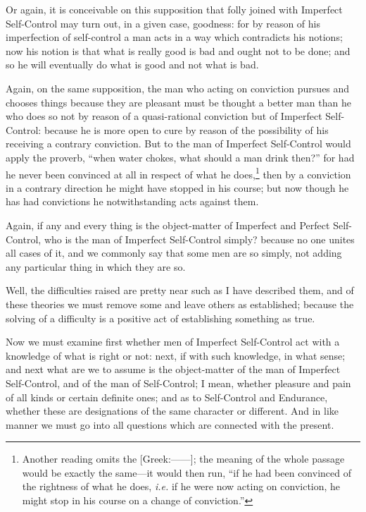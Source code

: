 Or again, it is conceivable on this supposition that folly joined with
Imperfect Self-Control may turn out, in a given case, goodness: for by reason
of his imperfection of self-control a man acts in a way which contradicts his
notions; now his notion is that what is really good is bad and ought not to be
done; and so he will eventually do what is good and not what is bad.

Again, on the same supposition, the man who acting on conviction pursues and
chooses things because they are pleasant must be thought a better man than he
who does so not by reason of a quasi-rational conviction but of Imperfect
Self-Control: because he is more open to cure by reason of the possibility of
his receiving a contrary conviction. But to the man of Imperfect Self-Control
would apply the proverb, “when water chokes, what should a man drink
then?” for had he never been convinced at all in respect of what he
does,\footnote{Another reading omits the [Greek:——]; the meaning of the whole
passage would be exactly the same—it would then run, “if he had
been convinced of the rightness of what he does, \emph{i.e.} if he were now
acting on conviction, he might stop in his course on a change of
conviction.”}
then by a conviction in a contrary direction he might have stopped in his
course; but now though he has had convictions he notwithstanding acts against
them.

Again, if any and every thing is the object-matter of Imperfect and Perfect
Self-Control, who is the man of Imperfect Self-Control simply? because no one
unites all cases of it, and we commonly say that some men are so simply, not
adding any particular thing in which they are so.

Well, the difficulties raised are pretty near such as I have described them,
and of these theories we must remove some and leave others as established;
because the solving of a difficulty is a positive act of establishing something
as true.


Now we must examine first whether men of Imperfect Self-Control act with a
knowledge of what is right or not: next, if with such knowledge, in what sense;
and next what are we to assume is the object-matter of the man of Imperfect
Self-Control, and of the man of Self-Control; I mean, whether pleasure and pain
of all kinds or certain definite ones; and as to Self-Control and Endurance,
whether these are designations of the same character or different. And in like
manner we must go into all questions which are connected with the present.

